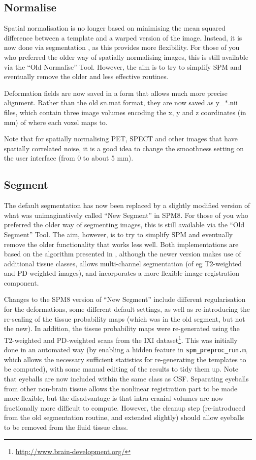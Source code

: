 \documentclass[a4paper,titlepage,openany]{article}
\begin{document}
\subsection{Normalise}
Spatial normalisation is no longer based on minimising the mean squared difference between a template and a warped version of the image.
Instead, it is now done via segmentation \cite{ashburner05}, as this provides more flexibility.
For those of you who preferred the older way of spatially normalising images, this is still available via the ``Old Normalise'' Tool.
However, the aim is to try to simplify SPM and eventually remove the older and less effective \cite{klein_evaluation} routines.

Deformation fields are now saved in a form that allows much more precise alignment.
Rather than the old sn.mat format, they are now saved as y\_$*$.nii files, which contain three image volumes encoding the x, y and z coordinates (in mm) of where each voxel maps to.

Note that for spatially normalising PET, SPECT and other images that have spatially correlated noise, it is a good idea to change the smoothness setting on the user interface (from 0 to about 5 mm).

\subsection{Segment}
The default segmentation has now been replaced by a slightly modified version of what was unimaginatively called ``New Segment'' in SPM8.
For those of you who preferred the older way of segmenting images, this is still available via the ``Old Segment'' Tool.
The aim, however, is to try to simplify SPM and eventually remove the older functionality that works less well.
Both implementations are based on the algorithm presented in \cite{ashburner05}, although the newer version makes use of additional tissue classes, allows multi-channel segmentation (of eg T2-weighted and PD-weighted images), and incorporates a more flexible image registration component.

Changes to the SPM8 version of ``New Segment'' include different regularisation for the deformations, some different default settings, as well as re-introducing the re-scaling of the tissue probability maps (which was in the old segment, but not the new).  In addition, the tissue probability maps were re-generated using the T2-weighted and PD-weighted scans from the IXI dataset\footnote{\url{http://www.brain-development.org/}}.
This was initially done in an automated way (by enabling a hidden feature in \texttt{spm\_preproc\_run.m}, which allows the necessary sufficient statistics for re-generating the templates to be computed), with some manual editing of the results to tidy them up.
Note that eyeballs are now included within the same class as CSF.
Separating eyeballs from other non-brain tissue allows the nonlinear registration part to be made more flexible, but the disadvantage is that intra-cranial volumes are now fractionally more difficult to compute.
However, the cleanup step (re-introduced from the old segmentation routine, and extended slightly) should allow eyeballs to be removed from the fluid tissue class.
\end{document}
